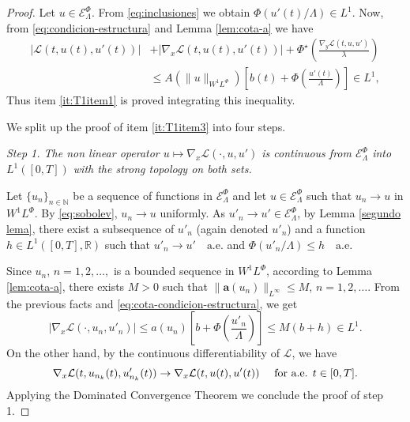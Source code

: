 \documentclass[twoside]{article}
\theoremstyle{remark}
\newcommand{\lphi}{L^{\Phi}}
\newcommand{\wphi}{W^{1}\lphi}
\newcommand{\sobnor}{\|_{W^{1}\lphi}}
\newcommand{\domi}{\mathcal{E}^{\Phi}}
\renewcommand{\b}[1]{\boldsymbol{#1}}
\newcommand{\rr}{\mathbb{R}}
\renewcommand{\leq}{\leqslant}
\begin{document}
\begin{proof}
Let $u\in \domi_{\Lambda}$. From \eqref{eq:inclusiones} we obtain $\Phi( u'(t)/\Lambda) \in L^1$.
Now, from  \eqref{eq:condicion-estructura} and Lemma \ref{lem:cota-a} we have
 \begin{equation}\label{eq:cota-condicion-estructura}
   \begin{split}
|\mathcal{L}(t,u(t),u'(t))|&+ |\nabla_x\mathcal{L}(t,u(t),u'(t))|
+\Phi^{\star}\left(\frac{\nabla_y\mathcal{L}(t,u,u')}{\lambda}\right)
\\
&\leq A(\|u\sobnor ) \left[b(t)+ \Phi\left(\frac{u'(t)}{\Lambda}\right) \right]\in
 L^1,
\end{split}
\end{equation}
Thus item \eqref{it:T1item1} is proved integrating this inequality.

We split up the proof of item \ref{it:T1item3} into four steps.

\noindent\emph{Step 1. The non linear operator  $u \mapsto \nabla_x\mathcal{L}(\cdot,u,u')$ is continuous from $\domi_{\Lambda}$ into $L^{1}([0,T])$ with the strong topology on both sets.} 



Let   $\{u_n\}_{n\in \mathbb{N}}$ be a sequence of  functions in $\domi_{\Lambda}$  
and let $u\in \domi_{\Lambda}$  such that $u_n\rightarrow u$ in $\wphi$.
By \eqref{eq:sobolev},  $u_n \to u$ uniformly.
As $u'_n\rightarrow u'\in\domi_{\Lambda}$, by 
  Lemma \ref{segundo lema}, there exist a subsequence of  $u'_{n}$ (again denoted $u'_{n}$) and a function  
	$h\in L^1([0,T],\rr)$
	such that  $u'_{n}\rightarrow u' \quad\text{a.e.}$ and $\Phi(u'_{n}/\Lambda)\leq h\quad\text{a.e}$.  

Since $u_{n}$, $n=1,2,\ldots,$ is a bounded sequence in $\wphi$, according to  Lemma \eqref{lem:cota-a}, 
there exists $M>0$ such that $\|\b{a}(u_{n})\|_{L^{\infty}} \leq M$, $n=1,2,\ldots$.  
From the previous facts and \eqref{eq:cota-condicion-estructura}, we get
\begin{equation*}\label{eq:DxL1-bis}
  |\nabla_x\mathcal{L}(\cdot,u_{n},u'_{n})|\leq a(u_{n})\left[b+\Phi\left(\frac{u'_{n}}{\Lambda}\right)\right]\leq
M (b+h) \in L^1.
\end{equation*}
On the other hand, by the continuous differentiability of $\mathcal{L}$, we have
\[\nabla_x\mathcal{L}(t,u_{n_k}(t),u'_{n_k}(t))\to \nabla_x\mathcal{L}(t,u(t),u'(t))\quad\hbox{ for a.e. } t\in[0,T].\]
Applying the Dominated Convergence Theorem we conclude the proof of step 1.



\end{proof}
\end{document}
